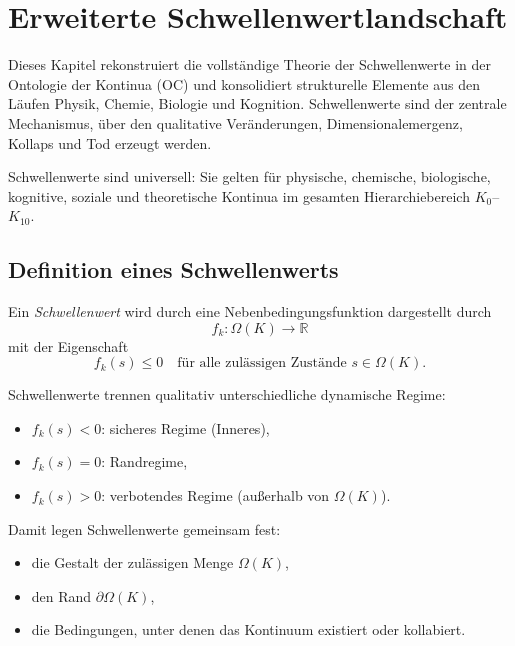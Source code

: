 
\section{Erweiterte Schwellenwertlandschaft}
\label{sec:thresholds-extended}

Dieses Kapitel rekonstruiert die vollständige Theorie der Schwellenwerte in der Ontologie der
Kontinua (OC) und konsolidiert strukturelle Elemente aus den Läufen Physik,
Chemie, Biologie und Kognition.
Schwellenwerte sind der zentrale Mechanismus, über den
qualitative Veränderungen, Dimensionalemergenz, Kollaps und Tod erzeugt werden.

Schwellenwerte sind universell: Sie gelten für physische, chemische, biologische,
kognitive, soziale und theoretische Kontinua im gesamten Hierarchiebereich
\(K_0\)–\(K_{10}\).

\subsection{Definition eines Schwellenwerts}

Ein \emph{Schwellenwert} wird durch eine Nebenbedingungsfunktion dargestellt durch
\[
   f_k : \Omega(K) \rightarrow \mathbb{R}
\]
mit der Eigenschaft
\[
   f_k(s) \le 0
   \quad\text{für alle zulässigen Zustände } s\in\Omega(K).
\]

Schwellenwerte trennen qualitativ unterschiedliche dynamische Regime:
\begin{itemize}
    \item \( f_k(s) < 0 \): sicheres Regime (Inneres),
    \item \( f_k(s) = 0 \): Randregime,
    \item \( f_k(s) > 0 \): verbotendes Regime (außerhalb von \(\Omega(K)\)).
\end{itemize}

Damit legen Schwellenwerte gemeinsam fest:
\begin{itemize}
    \item die Gestalt der zulässigen Menge \(\Omega(K)\),
    \item den Rand \(\partial\Omega(K)\),
    \item die Bedingungen, unter denen das Kontinuum existiert oder kollabiert.
\end{itemize}

